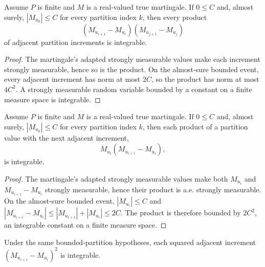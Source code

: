 \begin{lemma}\label{lem:Martingale.integrable_partition_increment_mul_increment_of_bound}
Assume \(P\) is finite and \(M\) is a real-valued true martingale.  If
\(0\le C\) and, almost surely, \(|M_{u_k}|\le C\) for every partition index
\(k\), then every product
\[
  (M_{u_{i+1}}-M_{u_i})(M_{u_{j+1}}-M_{u_j})
\]
of adjacent partition increments is integrable.
\end{lemma}

\begin{proof}
The martingale's adapted strongly measurable values make each increment
strongly measurable, hence so is the product.  On the almost-sure bounded
event, every adjacent increment has norm at most \(2C\), so the product has
norm at most \(4C^2\).  A strongly measurable random variable bounded by a
constant on a finite measure space is integrable.
\end{proof}

\begin{lemma}\label{lem:Martingale.integrable_partition_value_mul_increment_of_bound}
Assume \(P\) is finite and \(M\) is a real-valued true martingale.  If
\(0\le C\) and, almost surely, \(|M_{u_k}|\le C\) for every partition index
\(k\), then each product of a partition value with the next adjacent increment,
\[
  M_{u_i}(M_{u_{i+1}}-M_{u_i}),
\]
is integrable.
\end{lemma}

\begin{proof}
The martingale's adapted strongly measurable values make both
\(M_{u_i}\) and \(M_{u_{i+1}}-M_{u_i}\) strongly measurable, hence their
product is a.e. strongly measurable.  On the almost-sure bounded event,
\(|M_{u_i}|\le C\) and
\(|M_{u_{i+1}}-M_{u_i}|\le |M_{u_{i+1}}|+|M_{u_i}|\le 2C\).  The product is
therefore bounded by \(2C^2\), an integrable constant on a finite measure
space.
\end{proof}

\begin{lemma}\label{lem:Martingale.integrable_partition_sq_increment_of_bound}
Under the same bounded-partition hypotheses, each squared adjacent increment
\((M_{u_{i+1}}-M_{u_i})^2\) is integrable.
\end{lemma}

